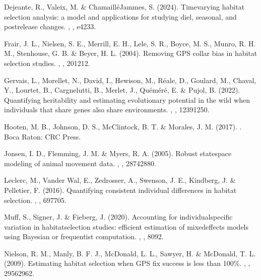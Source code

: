 \documentclass[letterpaper,10pt,english]{sphinxmanual}
\begin{document}
\sphinxAtStartPar
Dejeante, R., Valeix, M. \& Chamaillé\sphinxhyphen{}Jammes, S. (2024). Time\sphinxhyphen{}varying habitat selection analysis: a model and applications for studying diel, seasonal, and post\sphinxhyphen{}release changes. , , e4233.

\sphinxAtStartPar
Frair, J. L., Nielsen, S. E., Merrill, E. H., Lele, S. R., Boyce, M. S., Munro, R. H. M., Stenhouse, G. B. \& Beyer, H. L. (2004). Removing GPS collar bias in habitat selection studies. , , 201\textendash{}212.

\sphinxAtStartPar
Gervais, L., Morellet, N., David, I., Hewison, M., Réale, D., Goulard, M., Chaval, Y., Lourtet, B., Cargnelutti, B., Merlet, J., Quéméré, E. \& Pujol, B. (2022). Quantifying heritability and estimating evolutionary potential in the wild when individuals that share genes also share environments. , , 1239\textendash{}1250.

\sphinxAtStartPar
Hooten, M. B., Johnson, D. S., McClintock, B. T. \& Morales, J. M. (2017). . Boca Raton: CRC Press.

\sphinxAtStartPar
Jonsen, I. D., Flemming, J. M. \& Myers, R. A. (2005). Robust state\sphinxhyphen{}space modeling of animal movement data. , , 2874\textendash{}2880.

\sphinxAtStartPar
Leclerc, M., Vander Wal, E., Zedrosser, A., Swenson, J. E., Kindberg, J. \& Pelletier, F. (2016). Quantifying consistent individual differences in habitat selection. , , 697\textendash{}705.

\sphinxAtStartPar
Muff, S., Signer, J. \& Fieberg, J. (2020). Accounting for individual\sphinxhyphen{}specific variation in habitat\sphinxhyphen{}selection studies: efficient estimation of mixed\sphinxhyphen{}effects models using Bayesian or frequentist computation. , , 80\textendash{}92.

\sphinxAtStartPar
Nielson, R. M., Manly, B. F. J., McDonald, L. L., Sawyer, H. \& McDonald, T. L. (2009). Estimating habitat selection when GPS fix success is less than 100\%. , , 2956\textendash{}2962.
\end{document}
